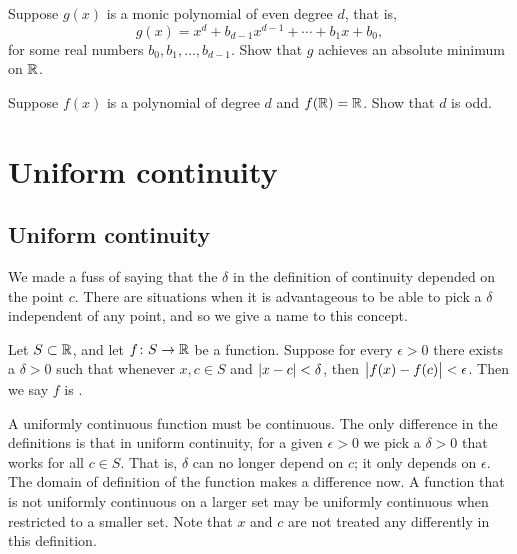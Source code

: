 \begin{exercise}
Suppose $g(x)$ is a monic polynomial of even degree $d$, that is,
\begin{equation*}
g(x) = x^d + b_{d-1} x^{d-1} + \cdots + b_1 x + b_0 ,
\end{equation*}
for some real numbers $b_{0}, b_1, \ldots, b_{d-1}$.
Show that $g$ achieves an absolute minimum on ${\mathbb{R}}$.
\end{exercise}

\begin{exercise}
Suppose $f(x)$ is a polynomial of degree $d$ and 
$f({\mathbb{R}}) = {\mathbb{R}}$.  Show that $d$ is odd.
\end{exercise}


\sectionnewpage
\section{Uniform continuity}
\label{sec:unifcont}



\subsection{Uniform continuity}

We made a fuss of saying that the $\delta$ in the definition of
continuity depended on the point $c$.  There are situations when it is
advantageous to be able to pick a $\delta$ independent of any point, and so we
give a name to this concept.

\begin{defn}
Let $S \subset {\mathbb{R}}$, and let $f \colon S \to {\mathbb{R}}$ be a function.
Suppose for every $\epsilon > 0$ there exists a $\delta > 0$
such that whenever $x, c \in S$ and
$\lvert {x-c} \rvert < \delta$, then $\bigl\lvert {f(x)-f(c)} \bigr\rvert < \epsilon$.
Then we say $f$ is \emph{}.
\end{defn}

A uniformly continuous function must be continuous.
The only difference in the definitions
is that in uniform continuity,
for a given $\epsilon > 0$ we pick a $\delta > 0$ that
works for all $c \in S$.  That is, $\delta$ can no longer depend on $c$;
it only depends on $\epsilon$.  The domain of definition
of the function makes a difference now.  A function that is not uniformly
continuous on a larger set may be uniformly continuous when restricted to a
smaller set.
Note that $x$ and $c$ are not treated any differently
in this definition.

